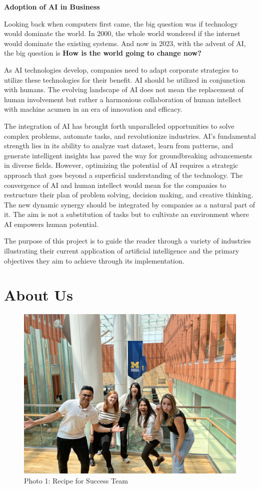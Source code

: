 \documentclass[
]{article}
\begin{document}
\textbf{Adoption of AI in Business}

Looking back when computers first came, the big question was if technology would dominate the world. In 2000, the whole world wondered if the internet would dominate the existing systems. And now in 2023, with the advent of AI, the big question is \textbf{How is the world going to change now?}

As AI technologies develop, companies need to adapt corporate strategies to utilize these technologies for their benefit. AI should be utilized in conjunction with humans. The evolving landscape of AI does not mean the replacement of human involvement but rather a harmonious collaboration of human intellect with machine acumen in an era of innovation and efficacy.

The integration of AI has brought forth unparalleled opportunities to solve complex problems, automate tasks, and revolutionize industries. AI's fundamental strength lies in its ability to analyze vast dataset, learn from patterns, and generate intelligent insights has paved the way for groundbreaking advancements in diverse fields. However, optimizing the potential of AI requires a strategic approach that goes beyond a superficial understanding of the technology.
The convergence of AI and human intellect would mean for the companies to restructure their plan of problem solving, decision making, and creative thinking. The new dynamic synergy should be integrated by companies as a natural part of it. The aim is not a substitution of tasks but to cultivate an environment where AI empowers human potential.

The purpose of this project is to guide the reader through a variety of industries illustrating their current application of artificial intelligence and the primary objectives they aim to achieve through its implementation.

\hypertarget{about-us}{%
\section{About Us}\label{about-us}}

\begin{figure}
\centering
\includegraphics{group_photo.jpg}
\caption{Photo 1: Recipe for Success Team}
\end{figure}
\end{document}
